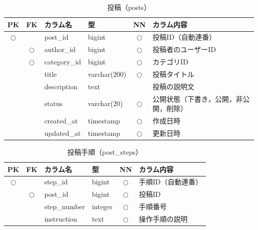 \begin{table}[H]
    \centering
    \caption{投稿（posts）}
    \label{tab:db_posts}
    \small
    \begin{tabularx}{\textwidth}{|c|c|l|l|c|X|}
        \hline
        PK & FK & カラム名 & 型 & NN & カラム内容 \\ \hline
        $\bigcirc$ & & post\_id & bigint & $\bigcirc$ & 投稿ID（自動連番） \\ \hline
        & $\bigcirc$ & author\_id & bigint & $\bigcirc$ & 投稿者のユーザーID \\ \hline
        & $\bigcirc$ & category\_id & bigint & $\bigcirc$ & カテゴリID \\ \hline
        & & title & varchar(200) & $\bigcirc$ & 投稿タイトル \\ \hline
        & & description & text & & 投稿の説明文 \\ \hline
        & & status & varchar(20) & $\bigcirc$ & 公開状態（下書き，公開，非公開，削除） \\ \hline
        & & created\_at & timestamp & $\bigcirc$ & 作成日時 \\ \hline
        & & updated\_at & timestamp & $\bigcirc$ & 更新日時 \\ \hline
    \end{tabularx}
\end{table}



\begin{table}[H]
    \centering
    \caption{投稿手順（post\_steps）}
    \label{tab:db_post_steps}
    \small
    \begin{tabularx}{\textwidth}{|c|c|l|l|c|X|}
        \hline
        PK & FK & カラム名 & 型 & NN & カラム内容 \\ \hline
        $\bigcirc$ & & step\_id & bigint & $\bigcirc$ & 手順ID（自動連番） \\ \hline
        & $\bigcirc$ & post\_id & bigint & $\bigcirc$ & 投稿ID \\ \hline
        & & step\_number & integer & $\bigcirc$ & 手順番号 \\ \hline
        & & instruction & text & $\bigcirc$ & 操作手順の説明 \\ \hline
    \end{tabularx}
\end{table}



